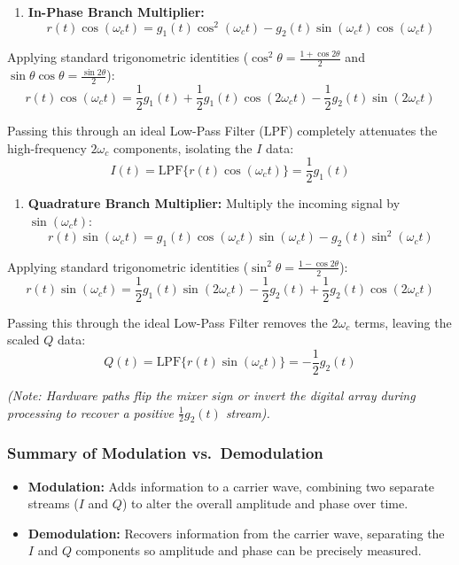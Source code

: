 \documentclass[
]{article}
\providecommand{\tightlist}{%
  \setlength{\itemsep}{0pt}\setlength{\parskip}{0pt}}
\begin{document}
\begin{enumerate}
\def\labelenumi{\arabic{enumi}.}
\tightlist
\item
  \textbf{In-Phase Branch Multiplier:}
  \[r(t)\cos(\omega_c t) = g_1(t)\cos^2(\omega_c t) - g_2(t)\sin(\omega_c t)\cos(\omega_c t)\]
\end{enumerate}

Applying standard trigonometric identities
(\(\cos^2 \theta = \frac{1+\cos2\theta}{2}\) and
\(\sin\theta\cos\theta = \frac{\sin2\theta}{2}\)):
\[r(t)\cos(\omega_c t) = \frac{1}{2}g_1(t) + \frac{1}{2}g_1(t)\cos(2\omega_c t) - \frac{1}{2}g_2(t)\sin(2\omega_c t)\]

Passing this through an ideal Low-Pass Filter (\(\text{LPF}\))
completely attenuates the high-frequency \(2\omega_c\) components,
isolating the \(I\) data:
\[I(t) = \text{LPF}\{ r(t)\cos(\omega_c t) \} = \frac{1}{2}g_1(t)\]

\begin{enumerate}
\def\labelenumi{\arabic{enumi}.}
\setcounter{enumi}{1}
\tightlist
\item
  \textbf{Quadrature Branch Multiplier:} Multiply the incoming signal by
  \(\sin(\omega_c t)\):
  \[r(t)\sin(\omega_c t) = g_1(t)\cos(\omega_c t)\sin(\omega_c t) - g_2(t)\sin^2(\omega_c t)\]
\end{enumerate}

Applying standard trigonometric identities
(\(\sin^2 \theta = \frac{1-\cos2\theta}{2}\)):
\[r(t)\sin(\omega_c t) = \frac{1}{2}g_1(t)\sin(2\omega_c t) - \frac{1}{2}g_2(t) + \frac{1}{2}g_2(t)\cos(2\omega_c t)\]

Passing this through the ideal Low-Pass Filter removes the \(2\omega_c\)
terms, leaving the scaled \(Q\) data:
\[Q(t) = \text{LPF}\{ r(t)\sin(\omega_c t) \} = -\frac{1}{2}g_2(t)\]

\emph{(Note: Hardware paths flip the mixer sign or invert the digital
array during processing to recover a positive \(\frac{1}{2}g_2(t)\)
stream).}

\subsubsection{Summary of Modulation
vs.~Demodulation}\label{summary-of-modulation-vs.-demodulation}

\begin{itemize}
\tightlist
\item
  \textbf{Modulation:} Adds information to a carrier wave, combining two
  separate streams (\(I\) and \(Q\)) to alter the overall amplitude and
  phase over time.
\item
  \textbf{Demodulation:} Recovers information from the carrier wave,
  separating the \(I\) and \(Q\) components so amplitude and phase can
  be precisely measured.
\end{itemize}
\end{document}
